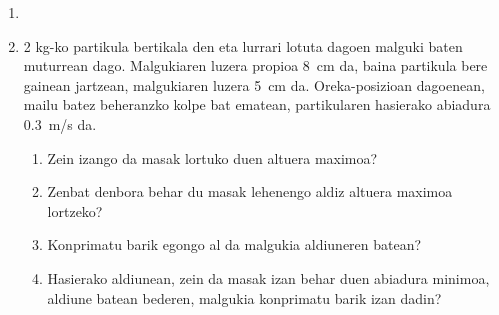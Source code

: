 \documentclass[12pt,twoside]{article}
\begin{document}
\begin{enumerate}
\item 
{}


\item
2 kg-ko partikula bertikala den eta lurrari lotuta dagoen malguki baten
 muturrean dago.
 Malgukiaren luzera propioa 8~cm da, baina partikula bere gainean 
jartzean, malgukiaren luzera 5~cm da. Oreka-posizioan dagoenean, mailu batez 
beheranzko kolpe bat ematean, partikularen hasierako abiadura 0.3~m/s da. 
\begin{enumerate}
\item Zein izango da masak lortuko duen altuera maximoa?
\item Zenbat denbora  behar du masak lehenengo aldiz altuera maximoa 
lortzeko?
\item  Konprimatu barik egongo al da malgukia aldiuneren batean?
\item Hasierako aldiunean, zein da masak izan behar duen abiadura minimoa,
 aldiune batean bederen, malgukia konprimatu barik izan dadin? 
\end{enumerate}


\end{enumerate}
\end{document}
